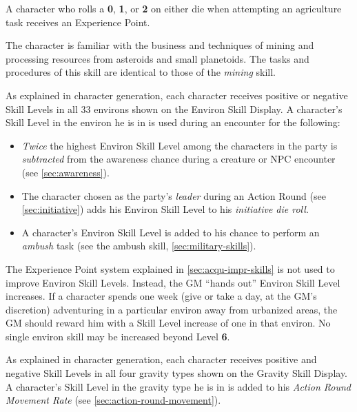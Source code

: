A character who rolls a \textbf{0}, \textbf{1}, or \textbf{2} on
either die when attempting an agriculture task receives an Experience
Point.

\label{sec:skill-asteroid-mining}

The character is familiar with the business and techniques of mining
and processing resources from asteroids and small planetoids.  The
tasks and procedures of this skill are identical to those of the
\emph{mining} skill.

\label{sec:skill-environs}

As explained in character generation, each character receives positive
or negative Skill Levels in all 33 environs shown on the Environ Skill
Display.  A character's Skill Level in the environ he is in is used
during an encounter for the following:

\begin{itemize}
\item \emph{Twice} the highest Environ Skill Level among the
  characters in the party is \emph{subtracted} from the awareness
  chance during a creature or NPC encounter (see \ref{sec:awareness}).
\item The character chosen as the party's \emph{leader} during an Action
  Round (see \ref{sec:initiative}) adds his Environ Skill Level to his
  \emph{initiative die roll}.
\item A character's Environ Skill Level is added to his chance to
  perform an \emph{ambush} task (see the ambush skill,
  \ref{sec:military-skills}). 
\end{itemize}

The Experience Point system explained in \ref{sec:acqu-impr-skills} is
not used to improve Environ Skill Levels.  Instead, the GM ``hands
out'' Environ Skill Level increases.  If a character spends one week
(give or take a day, at the GM's discretion) adventuring in a
particular environ away from urbanized areas, the GM should reward him
with a Skill Level increase of one in that environ.  No single environ
skill may be increased beyond Level \textbf{6}.

\label{sec:skill-gravity}

As explained in character generation, each character receives positive
and negative Skill Levels in all four gravity types shown on the
Gravity Skill Display.  A character's Skill Level in the gravity type
he is in is added to his \emph{Action Round Movement Rate} (see
\ref{sec:action-round-movement}).  

